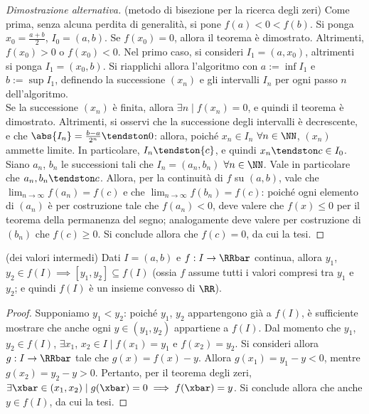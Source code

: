 \documentclass[11pt]{article}
\begin{document}
	\begin{proof}[Dimostrazione alternativa] (metodo di bisezione per la ricerca degli zeri)
		Come prima, senza alcuna perdita di generalità, si pone $f(a) < 0 < f(b)$. Si ponga $x_0 = \frac{a+b}{2}$,
		$I_0 = (a, b)$.
		Se $f(x_0) = 0$, allora il teorema è dimostrato. Altrimenti, $f(x_0) > 0$ o $f(x_0) < 0$. Nel primo caso,
		si consideri $I_1 = (a, x_0)$, altrimenti si ponga $I_1 = (x_0, b)$. Si riapplichi allora l'algoritmo con $a := \inf I_1$ e $b := \sup I_1$, definendo la successione $(x_n)$ e gli intervalli $I_n$ per ogni passo $n$ dell'algoritmo. \\
		
		Se la successione $(x_n)$ è finita, allora $\exists n \mid f(x_n) = 0$, e quindi il teorema è dimostrato. Altrimenti,
		si osservi che la successione degli intervalli è decrescente, e che $\abs{I_n} = \frac{b-a}{2^n} \tendston 0$:
		allora, poiché $x_n \in I_n$ $\forall n \in \NN$, $(x_n)$ ammette limite. In particolare, $I_n \tendston \{c\}$,
		e quindi $x_n \tendston c \in I_0$. Siano $a_n$, $b_n$ le successioni tali che $I_n = (a_n, b_n)$ $\forall n \in \NN$.
		Vale in particolare che $a_n, b_n \tendston c$. Allora, per la continuità di $f$ su $(a, b)$, vale che
		$\lim_{n \to \infty} f(a_n) = f(c)$ e che $\lim_{n \to \infty} f(b_n) = f(c)$: poiché ogni elemento di $(a_n)$ è
		per costruzione tale che $f(a_n) < 0$, deve valere che $f(x) \leq 0$ per il teorema della permanenza del segno; analogamente deve valere per costruzione di $(b_n)$ che $f(c) \geq 0$. Si conclude allora che $f(c) = 0$, da cui
		la tesi.
	\end{proof}

	\begin{corollary} (dei valori intermedi) Dati $I = (a, b)$ e
		$f : I \to \RRbar$ continua, allora $y_1$, $y_2 \in f(I) \implies
		[y_1, y_2] \subseteq f(I)$ (ossia $f$ assume tutti i valori
		compresi tra $y_1$ e $y_2$; e quindi $f(I)$ è un insieme convesso di $\RR$).
	\end{corollary}

	\begin{proof}
		Supponiamo $y_1 < y_2$: poiché $y_1$, $y_2$ appartengono già a $f(I)$, è sufficiente mostrare che anche ogni $y \in (y_1, y_2)$ appartiene a $f(I)$. Dal momento che $y_1$, $y_2 \in f(I)$, $\exists x_1$, $x_2 \in I \mid f(x_1) = y_1$ e $f(x_2) = y_2$. Si consideri allora $g : I \to \RRbar$ tale che
		$g(x) = f(x) - y$. Allora $g(x_1) = y_1 - y < 0$, mentre $g(x_2) = y_2 - y > 0$. Pertanto, per il teorema
		degli zeri, $\exists \xbar \in (x_1, x_2) \mid g(\xbar) = 0 \implies f(\xbar) = y$. Si conclude allora che anche
		$y \in f(I)$, da cui la tesi. 
	\end{proof}
\end{document}
